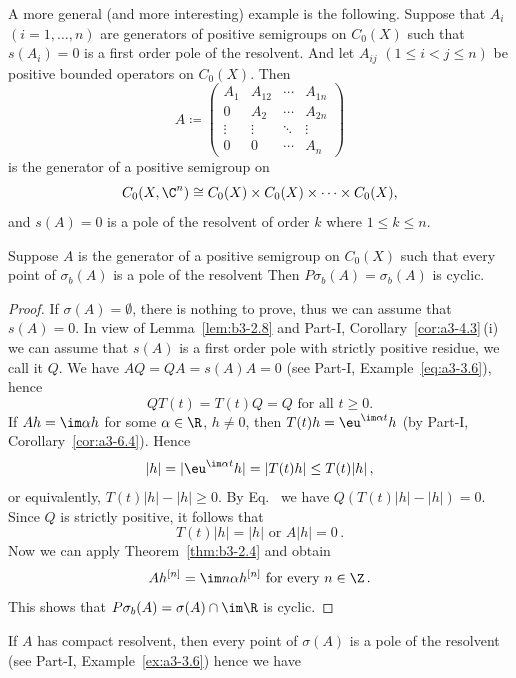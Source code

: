 A more general (and more interesting) example is the following.
Suppose that $A_{i}$ $(i = 1,\ldots,n)$ are generators of positive semigroups on $C_{0}(X)$ such that $s(A_{i}) = 0$ is a first order pole of the resolvent.
And let $A_{ij}$ $(1 \leq i < j \leq n)$ be positive bounded operators on $C_{0}(X)$.
Then
\[
A \coloneqq \begin{pmatrix}
	A_{1} & A_{12} & \cdots & A_{1n} \\
	0 & A_{2} & \cdots & A_{2n} \\
	\vdots & \vdots & \ddots & \vdots \\
	0 & 0 & \cdots & A_{n}
\end{pmatrix}
\]
is the generator of a positive semigroup on 
%
\[
	C_{0}(X,\C^{n}) \cong C_{0}(X) \times C_{0}(X) \times \cdots \times C_{0}(X) , 
\]
%
and $s(A) = 0$ is a pole of the resolvent of order $k$ where $1 \leq k \leq n$.
\begin{theorem}\label{thm:b3-2.9}
Suppose $A$ is the generator of a positive semigroup on $C_{0}(X)$ such that every point of\/ $\sigma_{b}(A)$ is a pole of the resolvent
Then $P\sigma_{b}(A) = \sigma_{b}(A)$ is cyclic.
\end{theorem}
\begin{proof}
	If\/ $\sigma(A) = \emptyset$, there is nothing to prove, thus we can assume that $s(A) = 0$.
	In view of Lemma~\ref{lem:b3-2.8} and Part-I,  Corollary~\ref{cor:a3-4.3}\,(i) we can assume that $s(A)$ is a first order pole with strictly positive residue, we call it $Q$.
	We have $AQ = QA = s(A)A = 0$ (see Part-I, Example~\ref{eq:a3-3.6}), hence
	\begin{equation}\label{eq:b3-2.18}
		QT(t) = T(t)Q = Q \text{ for all } t \geq 0.
	\end{equation}
	If\/ $Ah = \im\alpha h$ for some $\alpha \in \R$, $h \neq 0$, then $T(t)h = \eu^{\im\alpha t}h$ (by Part-I, Corollary~\ref{cor:a3-6.4}).
	Hence 
    \[
    |h| = |\eu^{\im\alpha t}h| = |T(t)h| \leq T(t)|h|\,,
    \]
    or equivalently, $T(t)|h| - |h| \geq 0$.
	By Eq.~ we have $Q(T(t)|h| - |h|) = 0$.
	Since $Q$ is strictly positive, it follows that 
    \[
    T(t)|h| = |h| \text{ or } A|h| = 0\,.
    \]
	Now we can apply Theorem~\ref{thm:b3-2.4} and obtain 
    \[
    Ah^{[n]} = \im n\alpha h^{[n]} \text{ for every } n \in \Z\,.
    \]
	This shows that $P\sigma_{b}(A) = \sigma(A) \cap \im\R$ is cyclic.
\end{proof}
If\/ $A$ has compact resolvent, then every point of\/ $\sigma(A)$ is a pole of the resolvent (see Part-I, Example~\ref{ex:a3-3.6}) hence we have

